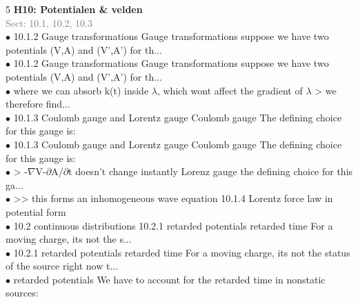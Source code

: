 \documentclass[7pt,a4paper]{article}
\begin{document}
\begin{multicols*}{5}
\textbf{H10: Potentialen & velden}\\\textcolor{gray}{{Sect: 10.1, 10.2, 10.3}}\\\vspace{0.5pt}
$\bullet$ 10.1.2 Gauge transformations
Gauge transformations suppose we have two potentials (V,A) and (V',A') for th...\\
$\bullet$ 10.1.2 Gauge transformations
Gauge transformations suppose we have two potentials (V,A) and (V',A') for th...\\
$\bullet$ where we can absorb k(t) inside $\lambda$, which wont affect the gradient of $\lambda$
> we therefore find...\\
$\bullet$ 10.1.3 Coulomb gauge and Lorentz gauge
Coulomb gauge The defining choice for this gauge is:\\
$\bullet$ 10.1.3 Coulomb gauge and Lorentz gauge
Coulomb gauge The defining choice for this gauge is:\\
$\bullet$ > -$\nabla$V-$\partial$A/$\partial$t doesn't change instantly
Lorenz gauge the defining choice for this ga...\\
$\bullet$ >> this forms an inhomogeneous wave equation
10.1.4 Lorentz force law in potential form\\
$\bullet$ 10.2 continuous distributions
10.2.1 retarded potentials
retarded time For a moving charge, its not the s...\\
$\bullet$ 10.2.1 retarded potentials
retarded time For a moving charge, its not the status of the source right now t...\\
$\bullet$ retarded potentials We have to account for the retarded time in nonstatic sources:\\
\columnbreak


\end{multicols*}
\end{document}
